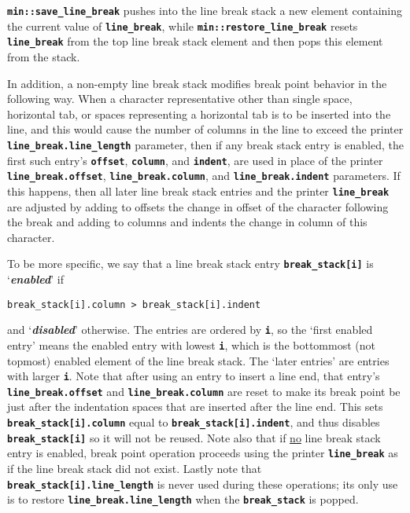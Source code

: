 \documentclass[12pt]{article}
\newcommand{\TT}[1]{{\tt \bfseries #1}}
\newcommand{\key}[1]{{\bf \em #1}\index{#1}}
\newcommand{\EOL}{\penalty \exhyphenpenalty}
\begin{document}
\TT{min::save\_line\_break}
pushes into the line break stack a new element containing
the current value of \TT{line\_\EOL break}, while
\TT{min::\EOL restore\_\EOL line\_\EOL break}
resets \TT{line\_\EOL break} from the top line break stack element and then
pops this element from the stack.

In addition, a non-empty line break stack modifies break point
behavior in the following way.
When a character representative other than single space, horizontal
tab, or spaces representing a horizontal tab
is to be inserted into the line, and this would cause the number
of columns in the line to exceed
the printer \TT{line\_\EOL break.line\_\EOL length} parameter,
then if any break stack entry is enabled, the first such entry's
\TT{offset}, \TT{column}, and \TT{indent},
are used in place of the printer
\TT{line\_\EOL break.offset},
\TT{line\_\EOL break.column}, and
\TT{line\_\EOL break.indent} parameters.
If this happens, then all later line break stack entries
and the printer \TT{line\_\EOL break}
are adjusted by adding to offsets
the change in offset of the character following the break and adding to
columns and indents the change in column of this character.

To be more specific, we say that a line break stack
entry \TT{break\_\EOL stack[i]} is `\key{enabled}' if
\begin{center}
\tt break\_stack[i].column > break\_stack[i].indent
\end{center}
and `\key{disabled}' otherwise.  The entries are ordered by \TT{i},
so the `first enabled entry' means the enabled entry with lowest \TT{i},
which is the bottommost (not topmost) enabled element of the line break stack.
The `later entries' are entries with larger \TT{i}.  Note that
after using an entry to insert a line end, that entry's
\TT{line\_\EOL break.offset}
and \TT{line\_\EOL break.column} are reset to make its break point
be just after the indentation spaces that are inserted after the line end.
This sets \TT{break\_\EOL stack[i].column}
equal to \TT{break\_\EOL stack[i].indent},
and thus disables \TT{break\_\EOL stack[i]} so it will not be reused.
Note also that if \underline{no} line break stack entry is enabled,
break point operation proceeds using the printer \TT{line\_\EOL break}
as if the line break stack did not exist.
Lastly note that \TT{break\_\EOL stack[i].line\_\EOL length} is never
used during these operations; its only use is to restore 
\TT{line\_\EOL break.line\_\EOL length} when the \TT{break\_\EOL stack}
is popped.
\end{document}
